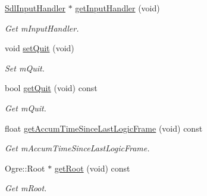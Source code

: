 \begin{DoxyCompactItemize}
\hyperlink{class_common_1_1_sdl_input_handler}{Sdl\+Input\+Handler} $\ast$ \hyperlink{class_common_1_1_graphics_system_a3996ebbb7e250c04cbf107efafd34984}{get\+Input\+Handler} (void)
\begin{DoxyCompactList}\small\item\em Get m\+Input\+Handler. \end{DoxyCompactList}\item 
\mbox{\label{class_common_1_1_graphics_system_acdbed0670eef23789a3c68e00d88ac4c}} 
void \hyperlink{class_common_1_1_graphics_system_acdbed0670eef23789a3c68e00d88ac4c}{set\+Quit} (void)
\begin{DoxyCompactList}\small\item\em Set m\+Quit. \end{DoxyCompactList}\item 
\mbox{\label{class_common_1_1_graphics_system_a216f755133f87e2074a36a556d303e41}} 
bool \hyperlink{class_common_1_1_graphics_system_a216f755133f87e2074a36a556d303e41}{get\+Quit} (void) const
\begin{DoxyCompactList}\small\item\em Get m\+Quit. \end{DoxyCompactList}\item 
\mbox{\label{class_common_1_1_graphics_system_a4a9abd5c431c9e61b48d4d167f775935}} 
float \hyperlink{class_common_1_1_graphics_system_a4a9abd5c431c9e61b48d4d167f775935}{get\+Accum\+Time\+Since\+Last\+Logic\+Frame} (void) const
\begin{DoxyCompactList}\small\item\em Get m\+Accum\+Time\+Since\+Last\+Logic\+Frame. \end{DoxyCompactList}\item 
\mbox{\label{class_common_1_1_graphics_system_a0890b804419adb1857d359810dec34ff}} 
Ogre\+::\+Root $\ast$ \hyperlink{class_common_1_1_graphics_system_a0890b804419adb1857d359810dec34ff}{get\+Root} (void) const
\begin{DoxyCompactList}\small\item\em Get m\+Root. \end{DoxyCompactList}\item 
\mbox{\label{class_common_1_1_graphics_system_a7b330688e6c66c74e23ec57eab54f341}} 

\end{DoxyCompactItemize}
